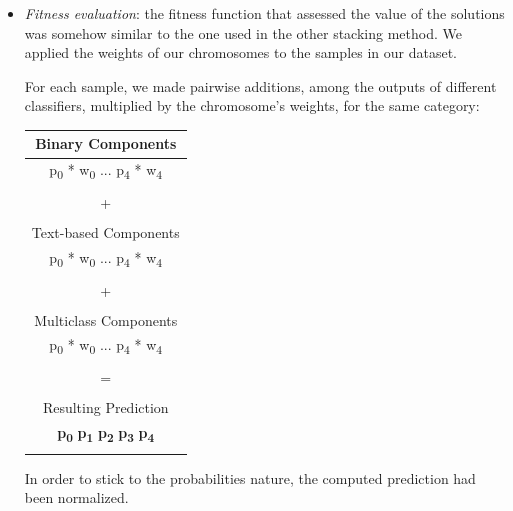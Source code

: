 \begin{itemize}
	\item[\PencilRight]\textit{Fitness evaluation}: the fitness function that assessed the value of the solutions was somehow similar to the one used in the other stacking method.
	We applied the weights of our chromosomes to the samples in our dataset.
	
	For each sample, we made pairwise additions, among the outputs of different classifiers, multiplied by the chromosome's weights, for the same category:
	\begin{center}
		\begin{tabular}{@{}c@{}}
			
			\multicolumn{1}{c}{Binary Components}\\
			\hline
			\multicolumn{1}{c}{p\textsubscript{0} * w\textsubscript{0} ... p\textsubscript{4} * w\textsubscript{4}}\\
			\hline\\
			\multicolumn{1}{c}{+}\\
			
			\\\multicolumn{1}{c}{Text-based Components}\\
			\hline
			\multicolumn{1}{c}{p\textsubscript{0} * w\textsubscript{0} ... p\textsubscript{4} * w\textsubscript{4}}\\
			\hline\\
			\multicolumn{1}{c}{+}\\
			
			\\\multicolumn{1}{c}{Multiclass Components}\\
			\hline
			\multicolumn{1}{c}{p\textsubscript{0} * w\textsubscript{0} ... p\textsubscript{4} * w\textsubscript{4}}\\
			\hline\\
			\multicolumn{1}{c}{=}\\
			
			\\\multicolumn{1}{c}{Resulting Prediction}\\
			\hline
			\multicolumn{1}{c}{\textbf{p\textsubscript{0}} \textbf{p\textsubscript{1}} \textbf{p\textsubscript{2}} \textbf{p\textsubscript{3}} \textbf{p\textsubscript{4}}}\\
			\hline\\
		\end{tabular}
	\end{center}
	
	In order to stick to the probabilities nature, the computed prediction had been normalized.
	

\end{itemize}
